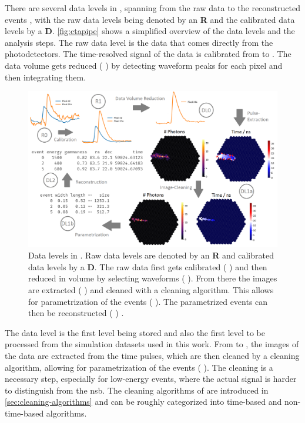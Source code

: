 There are several data levels in \ctapipe{}, spanning from the raw data \rzero{} to the reconstructed events
\dlt{}, with the raw data levels being denoted by an \textbf{R} and the calibrated data levels by a \textbf{D}.
\autoref{fig:ctapipe} shows a simplified overview of the data levels and the analysis steps.
The raw data level \rzero{} is the data that comes directly from the photodetectors. The time-resolved
signal of the data is calibrated from \rzero{} to \rone{}. The data volume gets reduced
(\rone{} \rightarrow \dlz{}) by detecting waveform peaks for each pixel and then integrating them.
\begin{figure}
    \centering
    \includegraphics[width=\textwidth]{graphics/ctapipe.png}
    \caption{Data levels in \ctapipe{}. Raw data levels are denoted by an \textbf{R} and calibrated
    data levels by a \textbf{D}. The raw data first gets calibrated (\rzero{} \rightarrow \rone{})
    and then reduced in volume by selecting waveforms (\rone{} \rightarrow \dlz{}). From there the
    images are extracted (\dlz{} \rightarrow \dloa{}) and cleaned with a cleaning algorithm. This
    allows for parametrization of the events (\dloa{} \rightarrow \dlob{}). The parametrized events
    can then be reconstructed (\dlob{} \rightarrow \dlt{}) \cite{noethe_thesis, hackfeld}.}
    \label{fig:ctapipe}
\end{figure}

The \dlz{} data level is the first level being stored and also the first level to be processed from
the simulation datasets used in this work. From \dlz{} to \dloa{}, the images of the data are extracted
from the time pulses, which are then cleaned by a cleaning algorithm, allowing for parametrization
of the events (\dloa{} \rightarrow \dlob{}). The cleaning is a necessary step, especially for
low-energy events, where the actual signal is harder to distinguish from the \gls{nsb}. The cleaning algorithms
of \ctapipe{} are introduced in \autoref{sec:cleaning-algorithms} and can be roughly categorized into
time-based and non-time-based algorithms.

